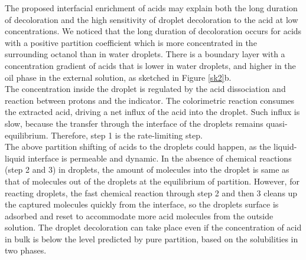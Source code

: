 \documentclass[journal=langd5,manuscript=article]{achemso}
\begin{document}
The proposed interfacial enrichment of acids may explain both the long duration of decoloration and the high sensitivity of droplet decoloration to the acid at low concentrations. We noticed that the long duration of decoloration occurs for acids with a positive partition coefficient which is more concentrated in the surrounding octanol than in water droplets. There is a boundary layer with a concentration gradient of acids that is lower in water droplets, and higher in the oil phase in the external solution, as sketched in Figure \ref{sk2}b. \\
The concentration inside the droplet is regulated by the acid dissociation and reaction between protons and the indicator. The colorimetric reaction consumes the extracted acid, driving a net influx of the acid into the droplet. Such influx is slow, because the transfer through the interface of the droplets remains quasi-equilibrium. Therefore, step 1 is the rate-limiting step.\\
The above partition shifting of acids to the droplets could happen, as the liquid-liquid interface is permeable and dynamic. In the absence of chemical reactions (step 2 and 3) in droplets, the amount of molecules into the droplet is same as that of molecules out of the droplets at the equilibrium of partition. However, for reacting droplets, the fast chemical reaction through step 2 and then 3 cleans up the captured molecules quickly from the interface, so the droplets surface is adsorbed and reset to accommodate more acid molecules from the outside solution. The droplet decoloration can take place even if the concentration of acid in bulk is below the level predicted by pure partition, based on the solubilities in two phases.\\
\end{document}

